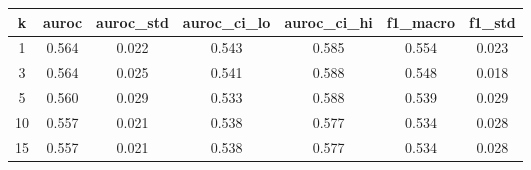 \begin{tabular*}{\linewidth}{@{\extracolsep{\fill}}ccccccc@{}}
\toprule
k & auroc & auroc\_std & auroc\_ci\_lo & auroc\_ci\_hi & f1\_macro & f1\_std \\
\midrule
1 & 0.564 & 0.022 & 0.543 & 0.585 & 0.554 & 0.023 \\
3 & 0.564 & 0.025 & 0.541 & 0.588 & 0.548 & 0.018 \\
5 & 0.560 & 0.029 & 0.533 & 0.588 & 0.539 & 0.029 \\
10 & 0.557 & 0.021 & 0.538 & 0.577 & 0.534 & 0.028 \\
15 & 0.557 & 0.021 & 0.538 & 0.577 & 0.534 & 0.028 \\
\bottomrule
\end{tabular*}
